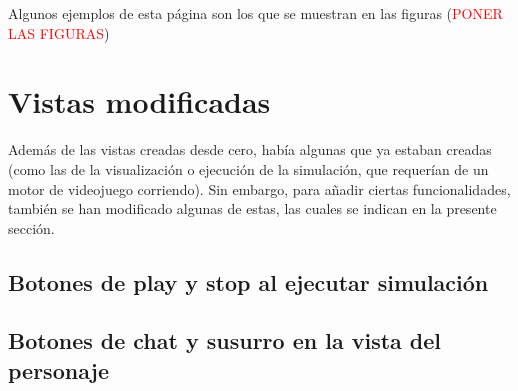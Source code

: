 Algunos ejemplos de esta página son los que se muestran en las figuras (\textcolor{red}{PONER LAS FIGURAS})

\section{Vistas modificadas}

Además de las vistas creadas desde cero, había algunas que ya estaban creadas (como las de la visualización o ejecución de la simulación, que requerían de un motor de videojuego corriendo). Sin embargo, para añadir ciertas funcionalidades, también se han modificado algunas de estas, las cuales se indican en la presente sección.

\subsection{Botones de play y stop al ejecutar simulación}

\subsection{Botones de chat y susurro en la vista del personaje}

